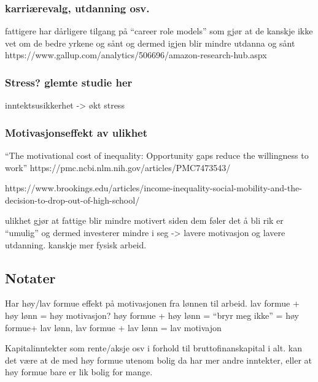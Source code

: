 \documentclass[
  12pt,
  a4paper,
  DIV=11,
  numbers=noendperiod]{scrartcl}
\begin{document}
\subsubsection{karriærevalg, utdanning
osv.}\label{karriuxe6revalg-utdanning-osv.}

fattigere har dårligere tilgang på ``career role models'' som gjør at de
kanskje ikke vet om de bedre yrkene og sånt og dermed igjen blir mindre
utdanna og sånt
https://www.gallup.com/analytics/506696/amazon-research-hub.aspx

\subsubsection{Stress? glemte studie
her}\label{stress-glemte-studie-her}

inntektsusikkerhet -\textgreater{} økt stress

\subsubsection{Motivasjonseffekt av
ulikhet}\label{motivasjonseffekt-av-ulikhet}

``The motivational cost of inequality: Opportunity gaps reduce the
willingness to work'' https://pmc.ncbi.nlm.nih.gov/articles/PMC7473543/

https://www.brookings.edu/articles/income-inequality-social-mobility-and-the-decision-to-drop-out-of-high-school/

ulikhet gjør at fattige blir mindre motivert siden dem føler det å bli
rik er ``umulig'' og dermed investerer mindre i seg -\textgreater{}
lavere motivasjon og lavere utdanning. kanskje mer fysisk arbeid.

\subsection{Notater}\label{notater-2}

Har høy/lav formue effekt på motivasjonen fra lønnen til arbeid. lav
formue + høy lønn = høy motivasjon? høy formue + høy lønn = ``bryr meg
ikke'' = høy formue+ lav lønn, lav formue + lav lønn = lav motivajon

Kapitalinntekter som rente/aksje osv i forhold til bruttofinanskapital i
alt. kan det være at de med høy formue utenom bolig da har mer andre
inntekter, eller at høy formue bare er lik bolig for mange.
\end{document}
